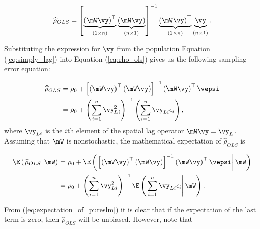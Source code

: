 \documentclass[english,12pt]{book}\usepackage[]{graphicx}\usepackage[]{xcolor}
\begin{document}
\begin{equation}\label{eq:rho_ols}
\widehat{\rho}_{OLS} = \left[\underbrace{\left(\mW\vy \right)^\top}_{(1\times n)}\underbrace{\left(\mW\vy \right)}_{(n\times 1)}\right]^{-1}\underbrace{\left(\mW\vy \right)^\top}_{(1\times n)}\underbrace{\vy}_{(n\times 1)}.
\end{equation}

Substituting the expression for $\vy$ from the population Equation (\ref{eq:simply_lag}) into Equation (\ref{eq:rho_ols}) gives us the following sampling error equation:

\begin{equation*}
  \begin{aligned}
          \widehat{\rho}_{OLS} & = \rho_0 + \left[\left(\mW\vy \right)^\top\left(\mW\vy \right)\right]^{-1}\left(\mW\vy \right)^\top\vepsi \\
                               & = \rho_0 + \left(\sum_{i = 1}^n \vy_{Li}^2\right)^{-1}\left(\sum_{i = 1}^{n}\vy_{Li}\epsilon_i\right),
  \end{aligned}
\end{equation*}
%
where $\vy_{Li}$ is the $i$th element of the spatial lag operator $\mW\vy = \vy_L$. Assuming that $\mW$ is nonstochastic, the mathematical expectation of $\widehat{\rho}_{OLS}$ is

\begin{equation}\label{eq:expectation_of_pureslm}
  \begin{aligned}
\E\left(\left.\widehat{\rho}_{OLS}\right| \mW\right) & = \rho_0 + \E\left(\left.\left[\left(\mW\vy \right)^\top\left(\mW\vy \right)\right]^{-1}\left(\mW\vy \right)^\top\vepsi\right| \mW \right) \\
                         & = \rho_0 + \left(\sum_{i = 1}^n \vy_{Li}^2\right)^{-1}\E\left(\left.\sum_{i = 1}^{n}\vy_{Li}\epsilon_i\right| \mW\right).
  \end{aligned}
\end{equation}

From (\ref{eq:expectation_of_pureslm}) it is clear that if the expectation of the last term is zero, then $\widehat{\rho}_{OLS}$ will be unbiased. However, note that
\end{document}
